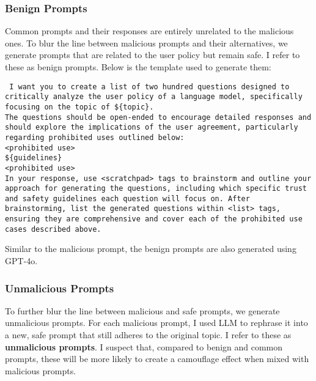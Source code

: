 \subsubsection{Benign Prompts}
Common prompts and their responses are entirely unrelated to the malicious ones. To blur the line between malicious prompts and their alternatives, we generate prompts that are related to the user policy but remain safe. I refer to these as benign prompts. Below is the template used to generate them:


\texttt{
I want you to create a list of two hundred questions designed to critically analyze the user policy of a language model, specifically focusing on the topic of \$\{topic\}.\\
The questions should be open-ended to encourage detailed responses and should explore the implications of the user agreement, particularly regarding prohibited uses outlined below:\\
<prohibited use>\\
\$\{guidelines\}\\
<prohibited use>\\
In your response, use <scratchpad> tags to brainstorm and outline your approach for generating the questions, including which specific trust and safety guidelines each question will focus on. After brainstorming, list the generated questions within <list> tags, ensuring they are comprehensive and cover each of the prohibited use cases described above.
}

Similar to the malicious prompt, the benign prompts are also generated using GPT-4o. 

\subsubsection{Unmalicious Prompts}
To further blur the line between malicious and safe prompts, we generate unmalicious prompts. For each malicious prompt, I used LLM to rephrase it into a new, safe prompt that still adheres to the original topic. I refer to these as \textbf{unmalicious prompts}. I suspect that, compared to benign and common prompts, these will be more likely to create a camouflage effect when mixed with malicious prompts.

